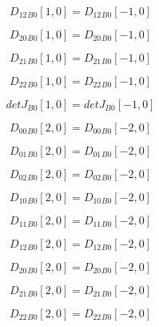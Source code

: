 \documentclass{article}
\begin{document}
\begin{dmath}{D_{12}{_{B0}}}[{1,0}] = {D_{12}{_{B0}}}[{-1,0}]\end{dmath}

\begin{dmath}{D_{20}{_{B0}}}[{1,0}] = {D_{20}{_{B0}}}[{-1,0}]\end{dmath}

\begin{dmath}{D_{21}{_{B0}}}[{1,0}] = {D_{21}{_{B0}}}[{-1,0}]\end{dmath}

\begin{dmath}{D_{22}{_{B0}}}[{1,0}] = {D_{22}{_{B0}}}[{-1,0}]\end{dmath}

\begin{dmath}{detJ{_{B0}}}[{1,0}] = {detJ{_{B0}}}[{-1,0}]\end{dmath}

\begin{dmath}{D_{00}{_{B0}}}[{2,0}] = {D_{00}{_{B0}}}[{-2,0}]\end{dmath}

\begin{dmath}{D_{01}{_{B0}}}[{2,0}] = {D_{01}{_{B0}}}[{-2,0}]\end{dmath}

\begin{dmath}{D_{02}{_{B0}}}[{2,0}] = {D_{02}{_{B0}}}[{-2,0}]\end{dmath}

\begin{dmath}{D_{10}{_{B0}}}[{2,0}] = {D_{10}{_{B0}}}[{-2,0}]\end{dmath}

\begin{dmath}{D_{11}{_{B0}}}[{2,0}] = {D_{11}{_{B0}}}[{-2,0}]\end{dmath}

\begin{dmath}{D_{12}{_{B0}}}[{2,0}] = {D_{12}{_{B0}}}[{-2,0}]\end{dmath}

\begin{dmath}{D_{20}{_{B0}}}[{2,0}] = {D_{20}{_{B0}}}[{-2,0}]\end{dmath}

\begin{dmath}{D_{21}{_{B0}}}[{2,0}] = {D_{21}{_{B0}}}[{-2,0}]\end{dmath}

\begin{dmath}{D_{22}{_{B0}}}[{2,0}] = {D_{22}{_{B0}}}[{-2,0}]\end{dmath}
\end{document}
